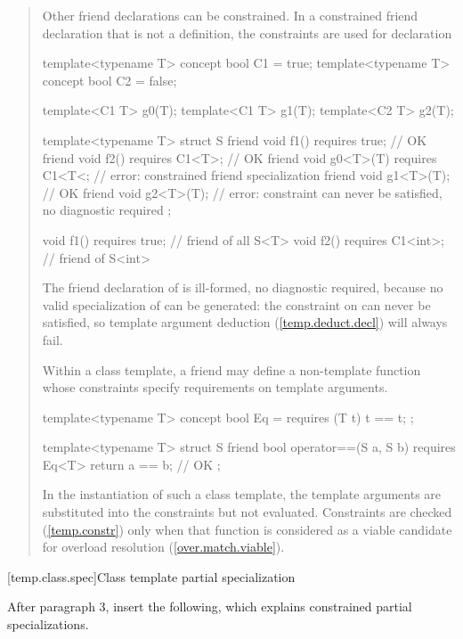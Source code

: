 \begin{quote}
\begin{addedblock}
\pnum
\enternote
Other friend declarations can be constrained. In a constrained friend 
declaration that is not a definition, the constraints are used for declaration
\exitnote
\enterexample
\begin{codeblock}
template<typename T> concept bool C1 = true;
template<typename T> concept bool C2 = false;

template<C1 T> g0(T);
template<C1 T> g1(T);
template<C2 T> g2(T);

template<typename T>
  struct S {
    friend void f1() requires true;      // OK
    friend void f2() requires C1<T>;     // OK
    friend void g0<T>(T) requires C1<T<; // error: constrained friend specialization
    friend void g1<T>(T);                // OK
    friend void g2<T>(T);                // error: constraint can never be satisfied, no diagnostic required
  };

void f1() requires true;    // friend of all S<T>
void f2() requires C1<int>; // friend of S<int>
\end{codeblock}
The friend declaration of  is ill-formed, no
diagnostic required, because no valid specialization of 
can be generated: the constraint on  can never
be satisfied, so template argument deduction
(\ref{temp.deduct.decl}) will always fail.
\exitexample

\pnum
\enternote
Within a class template, a friend may define a non-template function
whose constraints specify requirements on template arguments.
\enterexample
\begin{codeblock}
template<typename T> concept bool Eq = requires (T t) { t == t; };

template<typename T>
  struct S {
    friend bool operator==(S a, S b) requires Eq<T> { return a == b; } // OK
  };
\end{codeblock}
\exitexample
In the instantiation of such a class template, the template
arguments are substituted into the constraints but not evaluated.
Constraints are checked (\ref{temp.constr}) only when
that function is considered as a viable candidate for overload resolution
(\ref{over.match.viable}).
\exitnote
\end{addedblock}
\end{quote}


[temp.class.spec]{Class template partial specialization}

After paragraph 3, insert the following, which explains constrained partial 
specializations.

